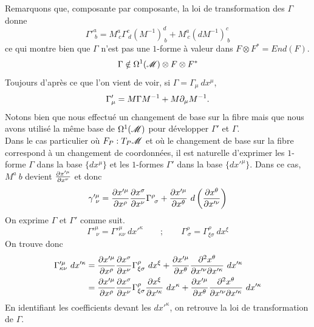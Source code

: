 \documentclass[a4paper,11pt]{report}
\begin{document}
            Remarquons que, composante par composante, la loi de transformation des $\Gamma$ donne 
            \begin{equation}
                \Gamma'^{a}_{~b} = M^a_{~c}\Gamma^c_{~d}(M^{-1})^d_{~b}+M^a_{~c}(dM^{-1})^c_{~b}
            \end{equation}
            ce qui montre bien que $\Gamma$ n'est pas une $1$-forme à valeur dans $F\otimes F^* = End(F)$.
            \begin{equation}
                \Gamma\notin \Omega^1(\mathscr{M})\otimes F \otimes F^*
            \end{equation}
            Toujours d'après ce que l'on vient de voir, si $\Gamma = \Gamma_\mu~dx^\mu$,
            \begin{equation}
                \Gamma'_{\mu} = M\Gamma M^{-1} + M\partial_\mu M^{-1}.
            \end{equation}
            Notons bien que nous effectué un changement de base sur la fibre mais que nous avons utilisé la même base de $\Omega^1(\mathscr{M})$ pour développer $\Gamma'$ et $\Gamma$.\\
            
            Dans le cas particulier où $F_P : T_P\mathscr{M}$ et où le changement de base sur la fibre correspond à un changement de coordonnées, il est naturelle d'exprimer les $1$-forme $\Gamma$ dans la base $\{dx^\mu\}$ et les $1$-formes $\Gamma'$ dans la base $\{dx'^\mu\}$. Dans ce cas, $M^a{~b}$ devient $\pdv{x'^\mu}{x^\nu}$ et donc 
            \begin{equation}
                \gamma'^\mu_{~\nu} = \pdv{x'^\mu}{x^\rho}\pdv{x^\sigma}{x^\nu}\Gamma^\rho_{~\sigma} + \pdv{x'^\mu}{x^\theta}~d\left( \pdv{x^\theta}{x'^\nu} \right)
            \end{equation}
            On exprime $\Gamma$ et $\Gamma'$ comme suit.
            \begin{equation}
                \Gamma'^\mu_{~\nu} =  \Gamma'^\mu_{\kappa\nu}~dx'^\kappa \qquad ; \qquad  \Gamma^\rho_{~\sigma} =  \Gamma^\rho_{\xi\sigma}~dx^\xi
            \end{equation}
            On trouve donc 
            \begin{align}
                \Gamma'^\mu_{\kappa\nu}~dx'^\kappa &= \pdv{x'^\mu}{x^\rho}\pdv{x^\sigma}{x^\nu} \Gamma^\rho_{\xi\sigma}~dx^\xi + \pdv{x'^\mu}{x^\theta}\pdv{x^\theta}{x'^\nu}{x'^\kappa}~dx'^\kappa\\
                &= \pdv{x'^\mu}{x^\rho}\pdv{x^\sigma}{x^\nu} \Gamma^\rho_{\xi\sigma}\pdv{x^\xi}{x'^\kappa}~dx^\kappa + \pdv{x'^\mu}{x^\theta}\pdv{x^\theta}{x'^\nu}{x'^\kappa}~dx'^\kappa
            \end{align}
            En identifiant les coefficients devant les $dx'^\kappa$, on retrouve la loi de transformation de $\Gamma$.
            
\end{document}
